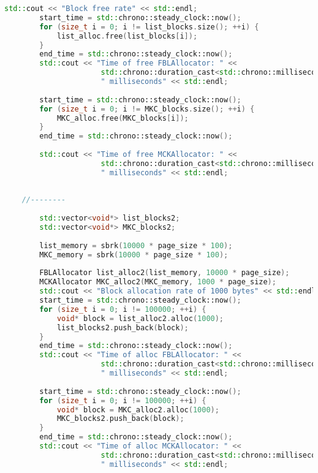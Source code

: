 \documentclass[a4paper, 12pt]{article}
\begin{document}
\begin{lstlisting}[language=C++]
        std::cout << "Block free rate" << std::endl;
        start_time = std::chrono::steady_clock::now();
        for (size_t i = 0; i != list_blocks.size(); ++i) {
            list_alloc.free(list_blocks[i]);
        }
        end_time = std::chrono::steady_clock::now();
        std::cout << "Time of free FBLAllocator: " << 
                      std::chrono::duration_cast<std::chrono::milliseconds>(end_time - start_time).count() << 
                      " milliseconds" << std::endl;
    
        start_time = std::chrono::steady_clock::now();
        for (size_t i = 0; i != MKC_blocks.size(); ++i) {
            MKC_alloc.free(MKC_blocks[i]);
        }
        end_time = std::chrono::steady_clock::now();
    
        std::cout << "Time of free MCKAllocator: " << 
                      std::chrono::duration_cast<std::chrono::milliseconds>(end_time - start_time).count() << 
                      " milliseconds" << std::endl;
    
    
    //--------
    
        std::vector<void*> list_blocks2;
        std::vector<void*> MKC_blocks2;
    
        list_memory = sbrk(10000 * page_size * 100); 
        MKC_memory = sbrk(10000 * page_size * 100);
    
        FBLAllocator list_alloc2(list_memory, 10000 * page_size);
        MCKAllocator MKC_alloc2(MKC_memory, 1000 * page_size);
        std::cout << "Block allocation rate of 1000 bytes" << std::endl;
        start_time = std::chrono::steady_clock::now();
        for (size_t i = 0; i != 100000; ++i) {
            void* block = list_alloc2.alloc(1000);
            list_blocks2.push_back(block);
        }
        end_time = std::chrono::steady_clock::now();
        std::cout << "Time of alloc FBLAllocator: " << 
                      std::chrono::duration_cast<std::chrono::milliseconds>(end_time - start_time).count() << 
                      " milliseconds" << std::endl;
    
        start_time = std::chrono::steady_clock::now();
        for (size_t i = 0; i != 100000; ++i) {
            void* block = MKC_alloc2.alloc(1000);
            MKC_blocks2.push_back(block);
        }
        end_time = std::chrono::steady_clock::now();
        std::cout << "Time of alloc MCKAllocator: " << 
                      std::chrono::duration_cast<std::chrono::milliseconds>(end_time - start_time).count() << 
                      " milliseconds" << std::endl;
    

\end{lstlisting}
\end{document}
